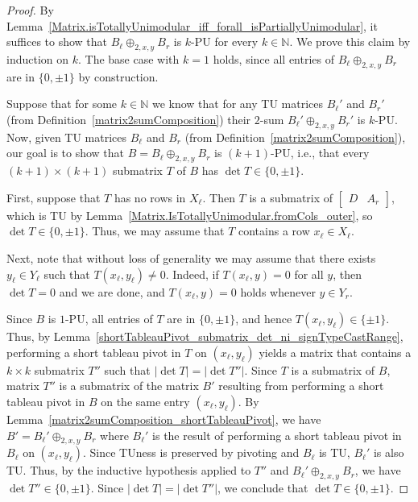\begin{proof}
    \leanok
    By Lemma~\ref{Matrix.isTotallyUnimodular_iff_forall_isPartiallyUnimodular}, it suffices to show that $B_{\ell} \oplus_{2, x, y} B_{r}$ is $k$-PU for every $k \in \mathbb{N}$. We prove this claim by induction on $k$. The base case with $k = 1$ holds, since all entries of $B_{\ell} \oplus_{2, x, y} B_{r}$ are in $\{0, \pm 1\}$ by construction.

    Suppose that for some $k \in \mathbb{N}$ we know that for any TU matrices $B_{\ell}'$ and $B_{r}'$ (from Definition~\ref{matrix2sumComposition}) their $2$-sum $B_{\ell}' \oplus_{2, x, y} B_{r}'$ is $k$-PU. Now, given TU matrices $B_{\ell}$ and $B_{r}$ (from Definition~\ref{matrix2sumComposition}), our goal is to show that $B = B_{\ell} \oplus_{2, x, y} B_{r}$ is $(k + 1)$-PU, i.e., that every $(k + 1) \times (k + 1)$ submatrix $T$ of $B$ has $\det T \in \{0, \pm 1\}$.

    First, suppose that $T$ has no rows in $X_{\ell}$. Then $T$ is a submatrix of $\begin{bmatrix} D & A_{r} \end{bmatrix}$, which is TU by Lemma~\ref{Matrix.IsTotallyUnimodular.fromCols_outer}, so $\det T \in \{0, \pm 1\}$. Thus, we may assume that $T$ contains a row $x_{\ell} \in X_{\ell}$.

    Next, note that without loss of generality we may assume that there exists $y_{\ell} \in Y_{\ell}$ such that $T (x_{\ell}, y_{\ell}) \neq 0$. Indeed, if $T (x_{\ell}, y) = 0$ for all $y$, then $\det T = 0$ and we are done, and $T (x_{\ell}, y) = 0$ holds whenever $y \in Y_{r}$.

    Since $B$ is $1$-PU, all entries of $T$ are in $\{0, \pm 1\}$, and hence $T (x_{\ell}, y_{\ell}) \in \{\pm 1\}$. Thus, by Lemma~\ref{shortTableauPivot_submatrix_det_ni_signTypeCastRange}, performing a short tableau pivot in $T$ on $(x_{\ell}, y_{\ell})$ yields a matrix that contains a $k \times k$ submatrix $T''$ such that $|\det T| = |\det T''|$. Since $T$ is a submatrix of $B$, matrix $T''$ is a submatrix of the matrix $B'$ resulting from performing a short tableau pivot in $B$ on the same entry $(x_{\ell}, y_{\ell})$. By Lemma~\ref{matrix2sumComposition_shortTableauPivot}, we have $B' = B_{\ell}' \oplus_{2, x, y} B_{r}$ where $B_{\ell}'$ is the result of performing a short tableau pivot in $B_{\ell}$ on $(x_{\ell}, y_{\ell})$. Since TUness is preserved by pivoting and $B_{\ell}$ is TU, $B_{\ell}'$ is also TU. Thus, by the inductive hypothesis applied to $T''$ and $B_{\ell}' \oplus_{2, x, y} B_{r}$, we have $\det T'' \in \{0, \pm 1\}$. Since $|\det T| = |\det T''|$, we conclude that $\det T \in \{0, \pm 1\}$.
\end{proof}

